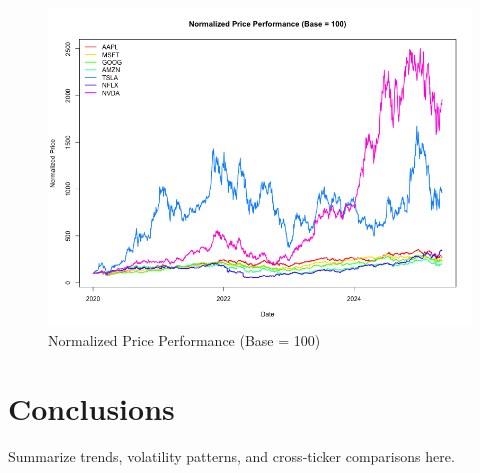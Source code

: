 \documentclass[11pt]{article}
\begin{document}
\begin{figure}[H]
  \centering
  \includegraphics[width=\textwidth]{img/plot-43.png}
  \caption{Normalized Price Performance (Base = 100)}
\end{figure}

\section{Conclusions}
Summarize trends, volatility patterns, and cross‐ticker comparisons here.
\end{document}
